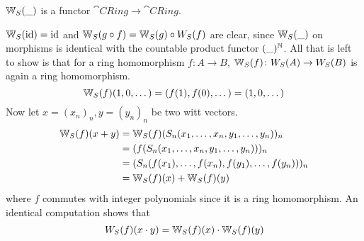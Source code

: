 \begin{proposition} \label{prop: W is a functor}
    $\mathbb{W}_S(\_)$ is a functor $\cat{CRing} \to \cat{CRing}$.
\end{proposition}
\begin{beweis}
$\mathbb{W}_S(\operatorname{id}) = \operatorname{id}$ and $\mathbb{W}_S(g \circ f) = \mathbb{W}_S(g) \circ W_S(f)$
are clear, since $\mathbb{W}_S(\_)$ on morphisms is identical with the countable product
functor $(\_)^{\mathbb{N}}$. All that is left to show is that for a ring homomorphism
$f\colon A \to B$, $\mathbb{W}_S(f) \colon W_S(A) \to W_S(B)$ is again 
a ring homomorphism.
\[
    \mathbb{W}_S(f)(1,0,\dots) = (f(1),f(0),\dots) = (1,0,\dots)
\]
Now let $x = (x_n)_n, y = (y_n)_n$ be two witt vectors.
\begin{align*}
    \mathbb{W}_S(f)(x+y) &= \mathbb{W}_S(f)(S_n(x_1,\dots,x_n,y_1,\dots,y_n))_n \\
    &= (f(S_n(x_1,\dots,x_n,y_1,\dots,y_n)))_n \\
    &= (S_n(f(x_1),\dots,f(x_n),f(y_1),\dots,f(y_n)))_n \\
    &= \mathbb{W}_S(f)(x) + \mathbb{W}_S(f)(y)
\end{align*}
where $f$ commutes with integer polynomials since it is a ring homomorphism.
An identical computation shows that
\[
    W_S(f)(x \cdot y) = \mathbb{W}_S(f)(x) \cdot \mathbb{W}_S(f)(y)
\]
\end{beweis}
